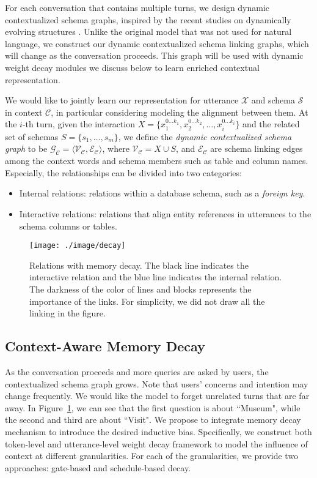 \documentclass[letterpaper]{article} \usepackage{aaai21}  \usepackage{times}  \usepackage{helvet} \usepackage{courier}  \usepackage[hyphens]{url}  \usepackage{graphicx} \urlstyle{rm} \def\UrlFont{\rm}  \usepackage{natbib}  \usepackage{caption} \frenchspacing  \setlength{\pdfpagewidth}{8.5in}  \setlength{\pdfpageheight}{11in}
\begin{document}
For each conversation that contains multiple turns, we design dynamic contextualized schema graphs, inspired by the recent studies on dynamically evolving structures \cite{pareja2020evolvegcn}. Unlike the original model that was not used for natural language, we construct our dynamic contextualized schema linking graphs, which will change as the conversation proceeds. This graph will be used with dynamic weight decay modules we discuss below to learn enriched contextual representation. 

We would like to jointly learn our representation for utterance $\mathcal{X}$ and schema $\mathcal{S}$ in context $\mathcal{C}$, in particular considering modeling the alignment between them. At the $i$-th turn, given the interaction $X = \{x_{1}^{0 \ldots k_{1}},x_{2}^{0 \ldots k_{2}},\ldots, x_i^{0 \ldots k_{i}}\}$ and the related set of schemas $S = \{{s}_{1}, \ldots, {s}_{m}\}$, we define the \textit{dynamic contextualized schema graph} to be $\mathcal{G}_\mathcal{C}= \langle \mathcal{V}_\mathcal{C}, \mathcal{E}_\mathcal{C} \rangle
$, where $\mathcal{V}_\mathcal{C} = X \cup S$, and $\mathcal{E}_\mathcal{C}$ are schema linking edges among the context words and schema members such as table and column names.
Especially, the relationships can be divided into two categories: 
\begin{itemize}
    \item Internal relations: relations within a database schema, such as a \textit{foreign key}. 
    \item Interactive relations:  relations that align entity references in utterances to the schema columns or tables.
\end{itemize}

\begin{figure}
	\centering
	\texttt{[image: ./image/decay]}
	\caption{Relations with memory decay. 
	The black line indicates the interactive relation and the blue line indicates the internal relation. The darkness of the color of lines and blocks represents the importance of the links. 
	For simplicity, we did not draw all the linking in the figure.}
	\label{decay}
\end{figure}

\subsection{Context-Aware Memory Decay}
\label{context}
As the conversation proceeds and more queries are asked by users, the contextualized schema graph grows. Note that users' concerns and intention may change frequently. We would like the model to forget unrelated turns that are far away.
In Figure~\ref{decay}, we can see that the first question is about ``Museum", while the second and third are about ``Visit".
We propose to integrate memory decay mechanism to introduce the desired inductive bias. Specifically, we construct both token-level and utterance-level weight decay framework to model the influence of context at different granularities.
For each of the granularities, we provide two approaches: gate-based and schedule-based decay.
\end{document}
